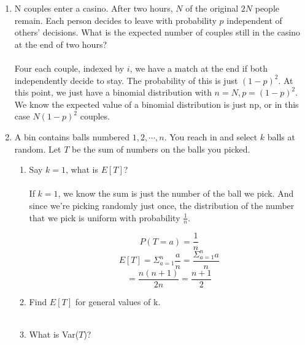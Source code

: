 
\usepackage{amsmath, dsfont}

\oddsidemargin 0in
\evensidemargin 0in
\textwidth 6.5in
\topmargin -0.5in
\textheight 9.0in
\newcommand{\norm}[1]{\left\lVert #1 \right\rVert}
\newcommand{\?}{\stackrel{?}{=}}
\newcommand\given[1][]{\:#1\vert\:}



\pagestyle{myheadings}

\begin{enumerate}
  \item N couples enter a casino. After two hours, $N$ of the original $2N$ people remain. Each person decides to leave with probability $p$ independent of others' decisions. What is the expected number of couples still in the casino at the end of two hours?\\\\

    Four each couple, indexed by $i$, we have a match at the end if both independently decide to stay. The probability of this is just $(1-p)^2$. At this point, we just have a binomial distribution with $n = N, p = (1-p)^2$. We know the expected value of a binomial distribution is just np, or in this case $N(1-p)^2$ couples.\\


  \item A bin contains balls numbered $1,2, \cdots, n$. You reach in and select $k$ balls at random. Let $T$ be the sum of numbers on the balls you picked.

    \begin{enumerate}      
      \item Say $k = 1$, what is $E[T]$?\\\\
        
        If $k = 1$, we know the sum is just the number of the ball we pick. And since we're picking randomly just once, the distribution of the number that we pick is uniform with probability $\frac{1}{n}$.

        $$P(T = a) = \frac{1}{n}$$
        $$E[T] = \Sigma_{a=1}^n \frac{a}{n} = \frac{\Sigma_{a=1}^n a}{n}$$
        $$= \frac{n(n+1)}{2n} = \frac{n+1}{2}$$

      \item Find $E[T]$ for general values of k.\\\\

      \item What is Var($T$)?\\\\      
    \end{enumerate}


\end{enumerate}
